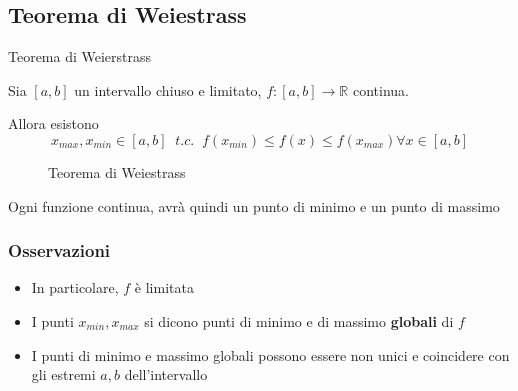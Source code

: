 \documentclass[a4paper]{article}
\theoremstyle{break}
\theoremstyle{break}
\theoremstyle{break}
\theoremstyle{break}
\begin{document}
\subsection{Teorema di Weiestrass}
\begin{definition}
  Teorema di Weierstrass

  Sia \( [a, b] \) un intervallo chiuso e limitato, \( f: [a,b]  \to \mathbb{R}\) continua.

  Allora esistono
  \[
    x_{max}, x_{min} \in [a,b]\;\; t.c.\;\; f(x_{min}) \le f(x) \le f(x_{max}) \forall x \in [a,b]
  \]
  \begin{figure}[H]
    \begin{center}
    \end{center}
    \caption{Teorema di Weiestrass}
  \end{figure}
  Ogni funzione continua, avrà quindi un punto di minimo e un punto di massimo
\end{definition}
\subsubsection{Osservazioni}
\begin{itemize}
  \item In particolare, \( f \) è limitata
  \item I punti \( x_{min}, x_{max} \) si dicono punti di minimo e di massimo \textbf{globali} di \( f \)
  \item I punti di minimo e massimo globali possono essere non unici e coincidere con gli estremi
    \( a,b \) dell'intervallo
\end{itemize}
\end{document}
